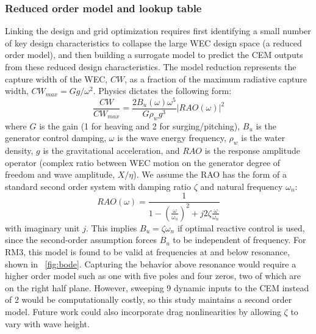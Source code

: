 \documentclass[10pt,twoside]{article}
\begin{document}
\subsubsection{Reduced order model and lookup table}
Linking the design and grid optimization requires first identifying a small number of key design characteristics to collapse the large WEC design space (a reduced order model), and then building a surrogate model to predict the CEM outputs from these reduced design characteristics. The model reduction represents the capture width of the WEC, $CW$, as a fraction of the maximum radiative capture width, $CW_{max}=Gg/\omega^2$. Physics dictates the following form:
\begin{equation}
    \label{eq:CW-fraction}
    \frac{CW}{CW_{max}} = \frac{2 B_u(\omega) \omega^5}{G \rho_w g^3} |RAO(\omega)|^2
\end{equation}
where $G$ is the gain (1 for heaving and 2 for surging/pitching), $B_u$ is the generator control damping, $\omega$ is the wave energy frequency, $\rho_w$ is the water density, $g$ is the gravitational acceleration, and $RAO$ is the response amplitude operator (complex ratio between WEC motion on the generator degree of freedom and wave amplitude, $X/\eta$).
We assume the RAO has the form of a standard second order system with damping ratio $\zeta$ and natural frequency $\omega_n$:
\begin{equation}
    \label{eq:rao}
    RAO(\omega) = \frac{1}{1-\left(\frac{\omega}{\omega_n}\right)^2 + j 2 \zeta \frac{\omega}{\omega_n}}
\end{equation}
with imaginary unit $j$.
This implies $B_u = \zeta \omega_n$ if optimal reactive control is used, since the second-order assumption forces $B_u$ to be independent of frequency.
For RM3, this model is found to be valid at frequencies at and below resonance, shown in \figureautorefname~\ref{fig:bode}.
Capturing the behavior above resonance would require a higher order model such as one with five poles and four zeros, two of which are on the right half plane.
However, sweeping 9 dynamic inputs to the CEM instead of 2 would be computationally costly, so this study maintains a second order model.
Future work could also incorporate drag nonlinearities by allowing $\zeta$ to vary with wave height.


\end{document}
